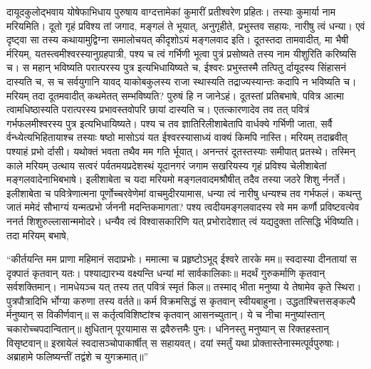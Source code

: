 \vakya दायूदकुलोद्भवाय योषेफाभिधाय पुरुषाय वाग्दत्तामेकां कुमारीं प्रतीश्वरेण प्रहितः। तस्याः कुमार्या नाम मरियमिति।
\vakya दूतो गृहं प्रविश्य तां जगाद, मङ्गलं ते भूयात्, अनुगृहीते, प्रभुस्तव सहायः, नारीषु त्वं धन्या।
\vakya एवं दृष्ट्वा सा तस्य कथायामुद्विग्ना समालोचयत् कीदृशोऽयं मङ्गलवाद इति।
\vakya दूतस्तदा तामवादीत्, मा भैषी र्मरियम्, यतस्त्वमीश्वरस्यानुग्रहपात्री,
\vakya पश्य च त्वं गर्भिणी भूत्वा पुत्रं प्रसोष्यते तस्य नाम यीशुरिति करिष्यसि च।
\vakya स महान् भविष्यति परात्परस्य पुत्र इत्यभिधायिष्यते च, ईश्वरः प्रभुस्तस्मै तत्पितु र्दायूदस्य सिंहासनं दास्यति च,
\vakya स च सर्वयुगानि यावद् याकोबकुलस्य राजा स्थास्यति तद्राज्यस्यान्तः कदापि न भविष्यति च।
\vakya मरियम् तदा दूतमवादीत् कथमेतत् सम्भविष्यति? पुरुषं हि न जानेऽहं।
\vakya दूतस्तां प्रतिबभाषे, पवित्र आत्मा त्वामधिष्ठास्यति परात्परस्य प्रभावस्तवोपरि छायां दास्यति च। एतत्कारणादेव तव तत् पवित्रं गर्भफलमीश्वरस्य पुत्र इत्यभिधायिष्यते।
\vakya पश्य च तव ज्ञातिरिलीशाबेतापि वार्धक्ये गर्भिणी जाता, सर्वै र्वन्ध्येत्यभिहितायाश्च तस्याः षष्ठो मासोऽयं
\vakya यत ईश्वरस्यासाध्यं वाक्यं किमपि नास्ति।
\vakya मरियम् तदाब्रवीत् पश्याहं प्रभो र्दासी। यथोक्तं भवता तथैव मम गति र्भूयात्। अनन्तरं दूतस्तस्याः समीपात् प्रतस्थे।
\vakya तस्मिन् काले मरियम् उत्थाय सत्वरं पर्वतमयप्रदेशस्थं यूदानगरं जगाम
\vakya सखरियस्य गृहं प्रविश्य चेलीशाबेतां मङ्गलवादेनाभिबभाषे।
\vakya इलीशाबेता च यदा मरियमो मङ्गलवादमश्रौषीत् तदैव तस्या जठरे शिशु र्ननर्ते।
\vakya इलीशाबेता च पवित्रेणात्मना पूर्णोच्चरवेणेमां वाचमुदीरयामास, धन्या त्वं नारीषु धन्यश्च तव गर्भफलं।
\vakya कथन्तु जातं ममेदं सौभाग्यं यन्मत्प्रभो र्जननी मदन्तिकमागता?
\vakya पश्य त्वदीयमङ्गलवादस्य रवे मम कर्णौ प्रविष्टवत्येव ननर्त शिशुरुल्लासान्ममोदरे।
\vakya धन्यैव त्वं विश्वासकारिणि यत् प्रभोरादेशात् त्वं यद्यदुक्ता तत्सिद्धि र्भविष्यति।
\vakya तदा मरियम् बभाषे,
\begin{poem}
\startwithline “कीर्तयन्ति मम प्राणा महिमानं सदाप्रभोः।
\vakya ममात्मा च प्रहृष्टोऽभूद् ईश्वरे तारके मम॥
\vakya स्वदास्या दीनतायां स दृक्पातं कृतवान् यतः।
\pline पश्याद्यारभ्य वक्ष्यन्ति धन्यां मां सार्वकालिकाः॥
\vakya मदर्थं गुरुकर्माणि कृतवान् सर्वशक्तिमान्।
\pline नामधेयञ्च यत् तस्य तत् पवित्रं स्मृतं किल॥
\vakya तस्माद् भीता मनुष्या ये तेषामेव कृते स्थिरा।
\pline पुत्रपौत्रादिभि र्भोग्या करुणा तस्य वर्तते॥
\vakya कर्म विक्रमसिद्धं स कृतवान् स्वीयबाहुना।
\pline उद्धतांश्चित्तसङ्कल्पै र्मनुष्यान् स विकीर्णवान्॥
\vakya स कर्तृत्वविशिष्टांश्च कृतवान् आसनच्युतान्।
\pline ये च नीचा मनुष्यांस्तान् चकारोच्चपदान्वितान्॥
\vakya क्षुधितान् पूरयामास स द्रवैरुत्तमैः पुनः।
\pline धनिनस्तु मनुष्यान् स रिक्तहस्तान् विसृष्टवान्॥
\vakya इस्रायेलं स्वदासञ्चोपाकार्षीत् स सहायवत्।
\pline दयां स्मर्तुं यथा प्रोक्तास्तेनास्मत्पूर्वपुरुषाः।
\vakya अब्राहामे फलिष्यन्तीं तद्वंशे च युगक्रमात्॥”
\end{poem}
